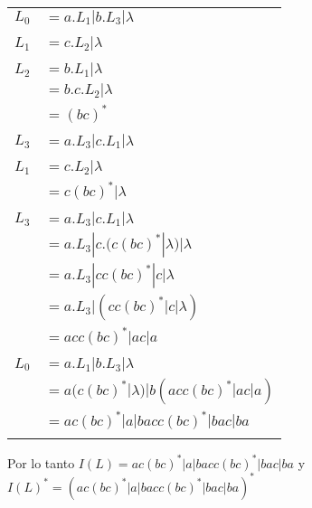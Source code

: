 \begin{tabular}{l l}
$L_0$ & $= a.L_1 | b.L_3 | \lambda$ \\ \\

$L_1$ & $= c.L_2 | \lambda$ \\ \\

$L_2$ & $= b.L_1 | \lambda$ \\
	  & $= b.c.L_2 | \lambda$ \\
	  & $= (bc)^*$ \\ \\

$L_3$ & $= a.L_3 | c.L_1 | \lambda$ \\ \\

$L_1$ & $= c.L_2 | \lambda$ \\
	  & $= c(bc)^* | \lambda$ \\ \\

$L_3$ & $= a.L_3 | c.L_1 | \lambda$ \\
	  & $= a.L_3 | c.(c(bc)^* | \lambda) | \lambda$ \\
	  & $= a.L_3 | cc(bc)^* | c | \lambda$ \\
	  & $= a.L_3 | (cc(bc)^* | c | \lambda)$ \\
	  & $= acc(bc)^* | ac | a$ \\ \\

$L_0$ & $= a.L_1 | b.L_3 | \lambda$ \\
	  & $= a(c(bc)^* | \lambda) | b(acc(bc)^* | ac | a)$ \\
	  & $= ac(bc)^* | a | bacc(bc)^* | bac | ba$ \\ \\
\end{tabular}

Por lo tanto $I(L) = ac(bc)^* | a | bacc(bc)^* | bac | ba$ y $I(L)^* = (ac(bc)^* | a | bacc(bc)^* | bac | ba)^*$

\subsection{}
